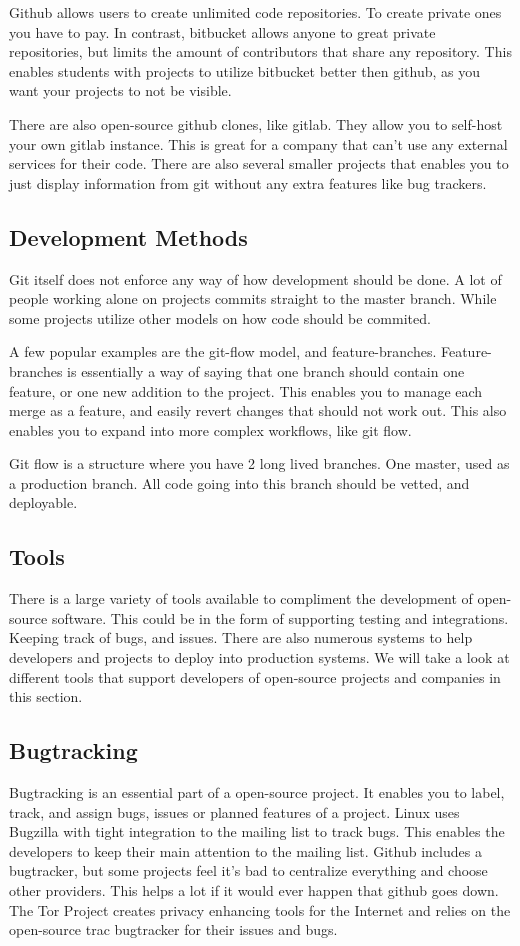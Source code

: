 \documentclass[12pt]{article}
\begin{document}
Github allows users to create unlimited code repositories. To create private
ones you have to pay. In contrast, bitbucket allows anyone to great private
repositories, but limits the amount of contributors that share any repository.
This enables students with projects to utilize bitbucket better then github, as
you want your projects to not be visible.

There are also open-source github clones, like gitlab. They allow you to
self-host your own gitlab instance. This is great for a company that can't use
any external services for their code. There are also several smaller projects
that enables you to just display information from git without any extra features
like bug trackers.


\subsection{Development Methods}
Git itself does not enforce any way of how development should be done. A lot of
people working alone on projects commits straight to the  master branch. While
some projects utilize other models on how code should be commited.

A few popular examples are the git-flow model\cite{git-flow}, and feature-branches.
Feature-branches is essentially a way of saying that one branch should contain
one feature, or one new addition to the project. This enables you to manage each
merge as a feature, and easily revert changes that should not work out. This
also enables you to expand into more complex workflows, like git flow.

Git flow is a structure where you have 2 long lived branches. One master, used
as a production branch. All code going into this branch should be vetted, and
deployable.

\subsection{Tools}
There is a large variety of tools available to compliment the development of
open-source software. This could be in the form of supporting testing and
integrations. Keeping track of bugs, and issues. There are also numerous systems
to help developers and projects to deploy into production systems. We will take
a look at different tools that support developers of open-source projects and
companies in this section.


\subsection{Bugtracking}
Bugtracking is an essential part of a open-source project. It enables you to
label, track, and assign bugs, issues or planned features of a project. Linux
uses Bugzilla with tight integration to the mailing list to track bugs. This
enables the developers to keep their main attention to the mailing list. Github
includes a bugtracker, but some projects feel it's bad to centralize everything
and choose other providers. This helps a lot if it would ever happen that github
goes down. The Tor Project creates privacy enhancing tools for the Internet and
relies on the open-source trac bugtracker for their issues and bugs.
\end{document}
